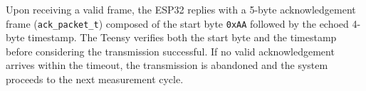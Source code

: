 Upon receiving a valid frame, the ESP32 replies with a 5-byte acknowledgement frame (\texttt{ack\_packet\_t}) composed of the start byte \texttt{0xAA} followed by the echoed 4-byte timestamp. The Teensy verifies both the start byte and the timestamp before considering the transmission successful. If no valid acknowledgement arrives within the timeout, the transmission is abandoned and the system proceeds to the next measurement cycle.
